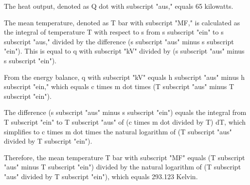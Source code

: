 The heat output, denoted as Q dot with subscript "aus," equals 65 kilowatts.

The mean temperature, denoted as T bar with subscript "MF," is calculated as the integral of temperature T with respect to s from s subscript "ein" to s subscript "aus," divided by the difference (s subscript "aus" minus s subscript "ein"). This is equal to q with subscript "kV" divided by (s subscript "aus" minus s subscript "ein").

From the energy balance, q with subscript "kV" equals h subscript "aus" minus h subscript "ein," which equals c times m dot times (T subscript "aus" minus T subscript "ein").

The difference (s subscript "aus" minus s subscript "ein") equals the integral from T subscript "ein" to T subscript "aus" of (c times m dot divided by T) dT, which simplifies to c times m dot times the natural logarithm of (T subscript "aus" divided by T subscript "ein").

Therefore, the mean temperature T bar with subscript "MF" equals (T subscript "aus" minus T subscript "ein") divided by the natural logarithm of (T subscript "aus" divided by T subscript "ein"), which equals 293.123 Kelvin.